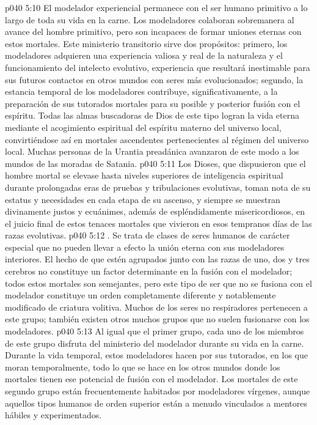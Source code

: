 \vs p040 5:10 El modelador experiencial permanece con el ser humano primitivo a lo largo de toda su vida en la carne. Los modeladores colaboran sobremanera al avance del hombre primitivo, pero son incapaces de formar uniones eternas con estos mortales. Este ministerio transitorio sirve dos propósitos: primero, los modeladores adquieren una experiencia valiosa y real de la naturaleza y el funcionamiento del intelecto evolutivo, experiencia que resultará inestimable para sus futuros contactos en otros mundos con seres más evolucionados; segundo, la estancia temporal de los modeladores contribuye, significativamente, a la preparación de sus tutorados mortales para su posible y posterior fusión con el espíritu. Todas las almas buscadoras de Dios de este tipo logran la vida eterna mediante el acogimiento espiritual del espíritu materno del universo local, convirtiéndose así en mortales ascendentes pertenecientes al régimen del universo local. Muchas personas de la Urantia preadánica avanzaron de este modo a los mundos de las moradas de Satania.
\vs p040 5:11 \pc Los Dioses, que dispusieron que el hombre mortal se elevase hasta niveles superiores de inteligencia espiritual durante prolongadas eras de pruebas y tribulaciones evolutivas, toman nota de su estatus y necesidades en cada etapa de su ascenso, y siempre se muestran divinamente justos y ecuánimes, además de espléndidamente misericordiosos, en el juicio final de estos tenaces mortales que vivieron en esos tempranos días de las razas evolutivas.
\vs p040 5:12 \pc {}. Se trata de clases de seres humanos de carácter especial que no pueden llevar a efecto la unión eterna con sus modeladores interiores. El hecho de que estén agrupados junto con las razas de uno, dos y tres cerebros no constituye un factor determinante en la fusión con el modelador; todos estos mortales son semejantes, pero este tipo de ser que no se fusiona con el modelador constituye un orden completamente diferente y notablemente modificado de criatura volitiva. Muchos de los seres no respiradores pertenecen a este grupo; también existen otros muchos grupos que no suelen fusionarse con los modeladores.
\vs p040 5:13 Al igual que el primer grupo, cada uno de los miembros de este grupo disfruta del ministerio del modelador durante su vida en la carne. Durante la vida temporal, estos modeladores hacen por sus tutorados, en los que moran temporalmente, todo lo que se hace en los otros mundos donde los mortales tienen ese potencial de fusión con el modelador. Los mortales de este segundo grupo están frecuentemente habitados por modeladores vírgenes, aunque aquellos tipos humanos de orden superior están a menudo vinculados a mentores hábiles y experimentados.
